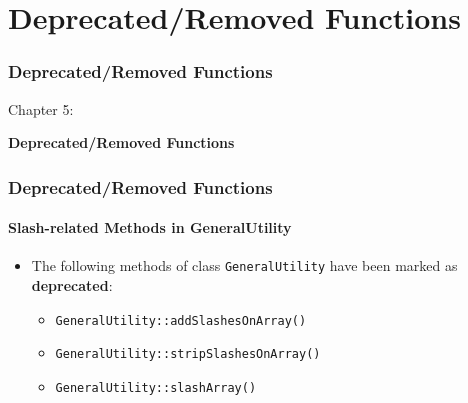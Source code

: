 %

\section{Deprecated/Removed Functions}
\begin{frame}[fragile]
	\frametitle{Deprecated/Removed Functions}

	\begin{center}\huge{Chapter 5:}\end{center}
	\begin{center}\huge{\color{typo3darkgrey}\textbf{Deprecated/Removed Functions}}\end{center}

\end{frame}


\begin{frame}[fragile]
	\frametitle{Deprecated/Removed Functions}
	\framesubtitle{Slash-related Methods in GeneralUtility}

	\begin{itemize}

		\item The following methods of class \texttt{GeneralUtility} have been marked
			as \textbf{deprecated}:

			\begin{itemize}
				\item \texttt{GeneralUtility::addSlashesOnArray()}
				\item \texttt{GeneralUtility::stripSlashesOnArray()}
				\item \texttt{GeneralUtility::slashArray()}
			\end{itemize}

	\end{itemize}

\end{frame}

